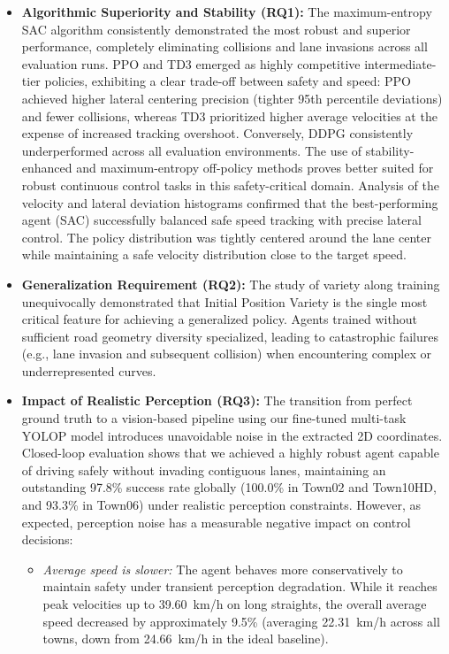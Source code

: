 \documentclass[sn-mathphys,Numbered]{sn-jnl}
\begin{document}
\begin{itemize}
    \item \textbf{Algorithmic Superiority and Stability (RQ1):} The maximum-entropy SAC algorithm consistently demonstrated the most robust and superior performance, completely eliminating collisions and lane invasions across all evaluation runs. PPO and TD3 emerged as highly competitive intermediate-tier policies, exhibiting a clear trade-off between safety and speed: PPO achieved higher lateral centering precision (tighter 95th percentile deviations) and fewer collisions, whereas TD3 prioritized higher average velocities at the expense of increased tracking overshoot. Conversely, DDPG consistently underperformed across all evaluation environments. The use of stability-enhanced and maximum-entropy off-policy methods proves better suited for robust continuous control tasks in this safety-critical domain. Analysis of the velocity and lateral deviation histograms confirmed that the best-performing agent (SAC) successfully balanced safe speed tracking with precise lateral control. The policy distribution was tightly centered around the lane center while maintaining a safe velocity distribution close to the target speed.
    \item \textbf{Generalization Requirement (RQ2):} The study of variety along training unequivocally demonstrated that Initial Position Variety is the single most critical feature for achieving a generalized policy. Agents trained without sufficient road geometry diversity specialized, leading to catastrophic failures (e.g., lane invasion and subsequent collision) when encountering complex or underrepresented curves.
    \item \textbf{Impact of Realistic Perception (RQ3):} The transition from perfect ground truth to a vision-based pipeline using our fine-tuned multi-task YOLOP model introduces unavoidable noise in the extracted 2D coordinates. Closed-loop evaluation shows that we achieved a highly robust agent capable of driving safely without invading contiguous lanes, maintaining an outstanding 97.8\% success rate globally (100.0\% in Town02 and Town10HD, and 93.3\% in Town06) under realistic perception constraints. However, as expected, perception noise has a measurable negative impact on control decisions: 
    \begin{itemize}
        \item \textit{Average speed is slower:} The agent behaves more conservatively to maintain safety under transient perception degradation. While it reaches peak velocities up to \SI{39.60}{km/h} on long straights, the overall average speed decreased by approximately 9.5\% (averaging \SI{22.31}{km/h} across all towns, down from \SI{24.66}{km/h} in the ideal baseline).

\end{itemize}
\end{itemize}
\end{document}
